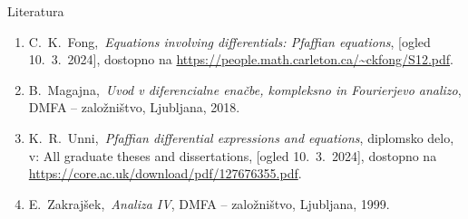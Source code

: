 \documentclass[t, 8pt]{beamer} %
\newcommand{\fillblack}[1]{
	\begin{tikzpicture}[remember picture, overlay]
		\node [shift={(0 cm,0cm)}]  at (current page.south west)
		{%
			\begin{tikzpicture}[remember picture, overlay] at (current page.south west)
				\draw [fill=black] (0, 0) -- (0,#1 \paperheight) --
				(\paperwidth,#1 \paperheight) -- (\paperwidth,0) -- cycle ;
			\end{tikzpicture}
		};
		\draw (current page.north west) rectangle (current page.south east);
	\end{tikzpicture}
}
\begin{document}
		\begin{frame}{Literatura}
			\begin{enumerate}
				\item C.~K.~Fong,~\emph{Equations involving differentials: Pfaffian equations}, [ogled 10.~3.~2024], dostopno na \url{https://people.math.carleton.ca/~ckfong/S12.pdf}.
				
				\item B.~Magajna,~\emph{Uvod v diferencialne enačbe, kompleksno in Fourierjevo analizo}, DMFA -- založništvo, Ljubljana, 2018.
				
				\item K.~R.~Unni,~\emph{Pfaffian differential expressions and equations}, diplomsko delo, v: All graduate theses and dissertations, [ogled 10.~3.~2024], dostopno na \url{https://core.ac.uk/download/pdf/127676355.pdf}.
				
				\item E.~Zakrajšek,~\emph{Analiza IV}, DMFA -- založništvo, Ljubljana, 1999.
			\end{enumerate}
		\end{frame}
		
	
\end{document}
